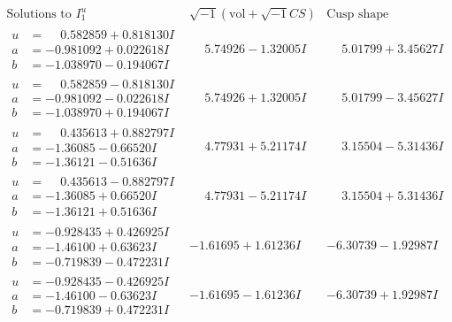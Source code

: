 \documentclass[1p]{elsarticle_modified}
\theoremstyle{definition}
\newcommand{\I}{\sqrt{-1}}
\begin{document}
$$\begin{array}{c|c|c}  
\text{Solutions to }I^u_{1}& \I (\text{vol} + \sqrt{-1}CS) & \text{Cusp shape}\\
 \hline 
\begin{aligned}
u &= \phantom{-}0.582859 + 0.818130 I \\
a &= -0.981092 + 0.022618 I \\
b &= -1.038970 - 0.194067 I\end{aligned}
 & \phantom{-}5.74926 - 1.32005 I & \phantom{-}5.01799 + 3.45627 I \\ \hline\begin{aligned}
u &= \phantom{-}0.582859 - 0.818130 I \\
a &= -0.981092 - 0.022618 I \\
b &= -1.038970 + 0.194067 I\end{aligned}
 & \phantom{-}5.74926 + 1.32005 I & \phantom{-}5.01799 - 3.45627 I \\ \hline\begin{aligned}
u &= \phantom{-}0.435613 + 0.882797 I \\
a &= -1.36085 - 0.66520 I \\
b &= -1.36121 - 0.51636 I\end{aligned}
 & \phantom{-}4.77931 + 5.21174 I & \phantom{-}3.15504 - 5.31436 I \\ \hline\begin{aligned}
u &= \phantom{-}0.435613 - 0.882797 I \\
a &= -1.36085 + 0.66520 I \\
b &= -1.36121 + 0.51636 I\end{aligned}
 & \phantom{-}4.77931 - 5.21174 I & \phantom{-}3.15504 + 5.31436 I \\ \hline\begin{aligned}
u &= -0.928435 + 0.426925 I \\
a &= -1.46100 + 0.63623 I \\
b &= -0.719839 - 0.472231 I\end{aligned}
 & -1.61695 + 1.61236 I & -6.30739 - 1.92987 I \\ \hline\begin{aligned}
u &= -0.928435 - 0.426925 I \\
a &= -1.46100 - 0.63623 I \\
b &= -0.719839 + 0.472231 I\end{aligned}
 & -1.61695 - 1.61236 I & -6.30739 + 1.92987 I \\ \hline\begin{aligned}

\end{aligned}
\end{array}$$
\end{document}
